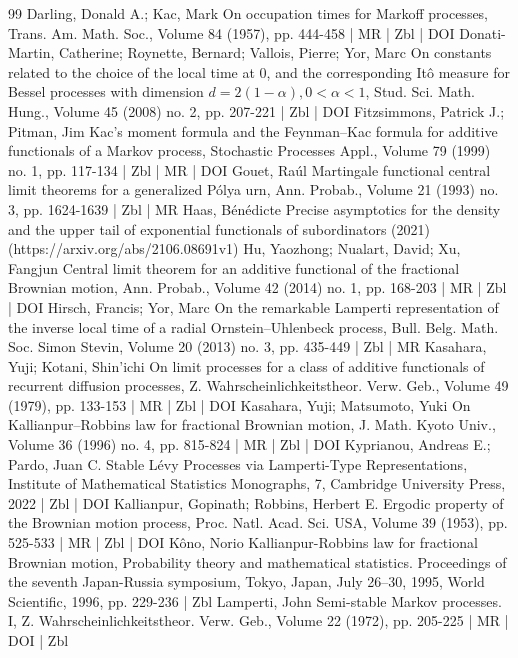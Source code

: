 \documentclass[10pt]{amsart}
\theoremstyle{definition}\newtheorem{defi}[theo]{Definition}\newtheorem{rema}[theo]{Remark}\newtheorem{exam}[theo]{Example}\newtheorem{exem}[theo]{Example}\newtheorem{nota}[theo]{Notation}
\begin{document}
\begin{thebibliography}{99}
Darling, Donald A.; Kac, Mark On occupation times for Markoff processes, Trans. Am. Math. Soc., Volume 84 (1957), pp. 444-458 | MR | Zbl | DOI
Donati-Martin, Catherine; Roynette, Bernard; Vallois, Pierre; Yor, Marc On constants related to the choice of the local time at $0$, and the corresponding Itô measure for Bessel processes with dimension $d=2(1-\alpha ),0<\alpha <1$, Stud. Sci. Math. Hung., Volume 45 (2008) no. 2, pp. 207-221 | Zbl | DOI
Fitzsimmons, Patrick J.; Pitman, Jim Kac’s moment formula and the Feynman–Kac formula for additive functionals of a Markov process, Stochastic Processes Appl., Volume 79 (1999) no. 1, pp. 117-134 | Zbl | MR | DOI
Gouet, Raúl Martingale functional central limit theorems for a generalized Pólya urn, Ann. Probab., Volume 21 (1993) no. 3, pp. 1624-1639 | Zbl | MR
Haas, Bénédicte Precise asymptotics for the density and the upper tail of exponential functionals of subordinators (2021) (https://arxiv.org/abs/2106.08691v1)
Hu, Yaozhong; Nualart, David; Xu, Fangjun Central limit theorem for an additive functional of the fractional Brownian motion, Ann. Probab., Volume 42 (2014) no. 1, pp. 168-203 | MR | Zbl | DOI
Hirsch, Francis; Yor, Marc On the remarkable Lamperti representation of the inverse local time of a radial Ornstein–Uhlenbeck process, Bull. Belg. Math. Soc. Simon Stevin, Volume 20 (2013) no. 3, pp. 435-449 | Zbl | MR
Kasahara, Yuji; Kotani, Shin’ichi On limit processes for a class of additive functionals of recurrent diffusion processes, Z. Wahrscheinlichkeitstheor. Verw. Geb., Volume 49 (1979), pp. 133-153 | MR | Zbl | DOI
Kasahara, Yuji; Matsumoto, Yuki On Kallianpur–Robbins law for fractional Brownian motion, J. Math. Kyoto Univ., Volume 36 (1996) no. 4, pp. 815-824 | MR | Zbl | DOI
Kyprianou, Andreas E.; Pardo, Juan C. Stable Lévy Processes via Lamperti-Type Representations, Institute of Mathematical Statistics Monographs, 7, Cambridge University Press, 2022 | Zbl | DOI
Kallianpur, Gopinath; Robbins, Herbert E. Ergodic property of the Brownian motion process, Proc. Natl. Acad. Sci. USA, Volume 39 (1953), pp. 525-533 | MR | Zbl | DOI
Kôno, Norio Kallianpur-Robbins law for fractional Brownian motion, Probability theory and mathematical statistics. Proceedings of the seventh Japan-Russia symposium, Tokyo, Japan, July 26–30, 1995, World Scientific, 1996, pp. 229-236 | Zbl
Lamperti, John Semi-stable Markov processes. I, Z. Wahrscheinlichkeitstheor. Verw. Geb., Volume 22 (1972), pp. 205-225 | MR | DOI | Zbl

\end{thebibliography}
\end{document}
